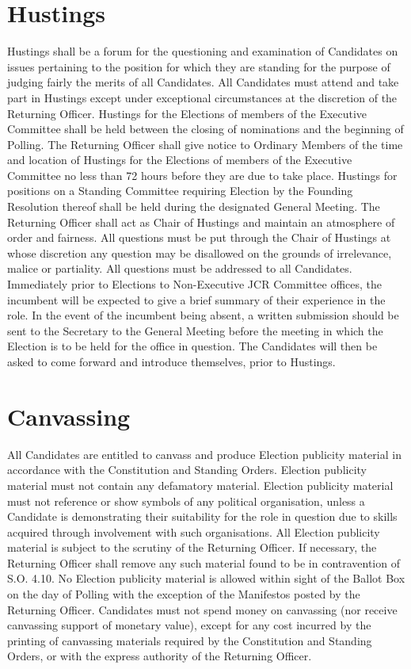 \section{Hustings} \label{sec:hustings}
\npara Hustings shall be a forum for the questioning and examination of Candidates on issues pertaining to the position for which they are standing for the purpose of judging fairly the merits of all Candidates.
\npara All Candidates must attend and take part in Hustings except under exceptional circumstances at the discretion of the Returning Officer.
\npara Hustings for the Elections of members of the Executive Committee shall be held between the closing of nominations and the beginning of Polling. The Returning Officer shall give notice to Ordinary Members of the time and location of Hustings for the Elections of members of the Executive Committee no less than 72 hours before they are due to take place.
\npara Hustings for positions on a Standing Committee requiring Election by the Founding Resolution thereof shall be held during the designated General Meeting.
\npara The Returning Officer shall act as Chair of Hustings and maintain an atmosphere of order and fairness.
\npara All questions must be put through the Chair of Hustings at whose discretion any question may be disallowed on the grounds of irrelevance, malice or partiality.
\npara All questions must be addressed to all Candidates.
\npara Immediately prior to Elections to Non-Executive JCR Committee offices, the incumbent will be expected to give a brief summary of their experience in the role.  In the event of the incumbent being absent, a written submission should be sent to the Secretary to the General Meeting before the meeting in which the Election is to be held for the office in question. The Candidates will then be asked to come forward and introduce themselves, prior to Hustings.
\section{Canvassing} \label{sec:canvassing}
\npara All Candidates are entitled to canvass and produce Election publicity material in accordance with the Constitution and Standing Orders.
\npara Election publicity material must not contain any defamatory material.
\npara Election publicity material must not reference or show symbols of any political organisation, unless a Candidate is demonstrating their suitability for the role in question due to skills acquired through involvement with such organisations.
\npara All Election publicity material is subject to the scrutiny of the Returning Officer. If necessary, the Returning Officer shall remove any such material found to be in contravention of S.O. 4.10.
\npara No Election publicity material is allowed within sight of the Ballot Box on the day of Polling with the exception of the Manifestos posted by the Returning Officer.
\npara Candidates must not spend money on canvassing (nor receive canvassing support of monetary value), except for any cost incurred by the printing of canvassing materials required by the Constitution and Standing Orders, or with the express authority of the Returning Officer.
